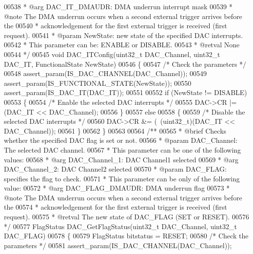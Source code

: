 \begin{DoxyCode}
00538 \textcolor{comment}{  *            @arg DAC\_IT\_DMAUDR: DMA underrun interrupt mask}
00539 \textcolor{comment}{  * @note   The DMA underrun occurs when a second external trigger arrives before the }
00540 \textcolor{comment}{  *         acknowledgement for the first external trigger is received (first request).}
00541 \textcolor{comment}{  * @param  NewState: new state of the specified DAC interrupts.}
00542 \textcolor{comment}{  *          This parameter can be: ENABLE or DISABLE.}
00543 \textcolor{comment}{  * @retval None}
00544 \textcolor{comment}{  */}
00545 \textcolor{keywordtype}{void} DAC_ITConfig(uint32\_t DAC\_Channel, uint32\_t DAC\_IT, FunctionalState NewState)
00546 \{
00547   \textcolor{comment}{/* Check the parameters */}
00548   assert_param(IS\_DAC\_CHANNEL(DAC\_Channel));
00549   assert_param(IS\_FUNCTIONAL\_STATE(NewState));
00550   assert_param(IS\_DAC\_IT(DAC\_IT));
00551 
00552   \textcolor{keywordflow}{if} (NewState != DISABLE)
00553   \{
00554     \textcolor{comment}{/* Enable the selected DAC interrupts */}
00555     DAC->CR |=  (DAC\_IT << DAC\_Channel);
00556   \}
00557   \textcolor{keywordflow}{else}
00558   \{
00559     \textcolor{comment}{/* Disable the selected DAC interrupts */}
00560     DAC->CR &= (~(uint32\_t)(DAC\_IT << DAC\_Channel));
00561   \}
00562 \}
00563 
00564 \textcolor{comment}{/**}
00565 \textcolor{comment}{  * @brief  Checks whether the specified DAC flag is set or not.}
00566 \textcolor{comment}{  * @param  DAC\_Channel: The selected DAC channel. }
00567 \textcolor{comment}{  *          This parameter can be one of the following values:}
00568 \textcolor{comment}{  *            @arg DAC\_Channel\_1: DAC Channel1 selected}
00569 \textcolor{comment}{  *            @arg DAC\_Channel\_2: DAC Channel2 selected}
00570 \textcolor{comment}{  * @param  DAC\_FLAG: specifies the flag to check. }
00571 \textcolor{comment}{  *          This parameter can be only of the following value:}
00572 \textcolor{comment}{  *            @arg DAC\_FLAG\_DMAUDR: DMA underrun flag}
00573 \textcolor{comment}{  * @note   The DMA underrun occurs when a second external trigger arrives before the }
00574 \textcolor{comment}{  *         acknowledgement for the first external trigger is received (first request).}
00575 \textcolor{comment}{  * @retval The new state of DAC\_FLAG (SET or RESET).}
00576 \textcolor{comment}{  */}
00577 FlagStatus DAC_GetFlagStatus(uint32\_t DAC\_Channel, uint32\_t DAC\_FLAG)
00578 \{
00579   FlagStatus bitstatus = RESET;
00580   \textcolor{comment}{/* Check the parameters */}
00581   assert_param(IS\_DAC\_CHANNEL(DAC\_Channel));

\end{DoxyCode}
